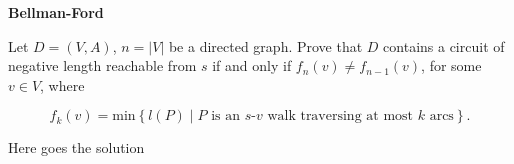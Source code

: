 \question \textbf{Bellman-Ford}

Let $D = (V, A)$, $n = \left|V \right|$ be a directed graph. Prove that $D$ contains a circuit of negative length reachable from $s$ if and only if $f_n(v) \neq f_{n−1}(v)$, for some $v \in V$, where 

$$f_k(v) = \text{min}\left\{l(P)\middle|P \text{ is an } s \text{-} v \text{ walk traversing at most } k \text{ arcs}\right\}.$$


\begin{solution}
Here goes the solution
\end{solution}



